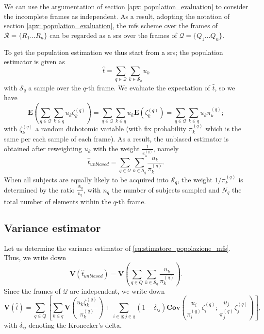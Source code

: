 \begin{appendices}
We can use the argumentation of section \ref{apx: population_evaluation} to consider the incomplete frames as independent.
As a result, adopting the notation of section \ref{apx: population_evaluation}, the \gls{mfs} scheme over the frames of $\mathcal{R} = \{R_{1} \dots R_{n}\}$ can be regarded as a \gls{srs} over the frames of $\mathcal{Q} = \{Q_{1} \dots Q_{n}\}.$

To get the population estimation we thus start from a \gls{srs}; the 
population estimator is given as
$$ \hat{t} = \sum_{q \in \mathcal{Q}}\sum_{k \in \mathcal{S}_q} u_{k}$$
with $\mathcal{S}_q$ a sample over the $q$-th frame.
We evaluate the expectation of $\hat{t}$, so we have
$$ \mathbf{E}\left(\sum_{q \in \mathcal{Q}}\sum_{k \in q} u_{k}\zeta^{(q)}_{k}\right) = \sum_{q \in \mathcal{Q}}\sum_{k \in q} u_{k} \mathbf{E}\left(\zeta^{(q)}_{k}\right) = \sum_{q \in \mathcal{Q}}\sum_{k \in q} u_{k}\pi^{(q)}_{k};$$ with $\zeta^{(q)}_{k}$ a random dichotomic variable (with fix probability $\pi^{(q)}_{k}$ which is the same per each sample of each frame).
As a result, the unbiased estimator is obtained after reweighting 
$u_{k}$ with the weight $\frac{1}{\pi^{(q)}_{k}}$, namely
\begin{equation}\label{eq:stimatore_popolazione_mfs}
    \hat{t}_{unbiased} = \sum_{q \in \mathcal{Q}}\sum_{k \in \mathcal{S}_q} \frac{u_{k}}{\pi^{(q)}_{k}}.
\end{equation} 
When all subjects are equally likely to be acquired into $\mathcal{S}_{q}$, the weight $1/\pi^{(q)}_{k}$ is determined by the ratio $\frac{N_{q}}{n_{q}}$, with $n_{q}$ the number of subjects sampled and $N_{q}$ the total number of elements within the $q$-th frame.

\subsection{Variance estimator}
Let us determine the variance estimator of \eqref{eq:stimatore_popolazione_mfs}.
Thus, we write down
$$\mathbf{V}(\hat{t}_{unbiased}) = \mathbf{V}\left(\sum_{q \in Q}\sum_{k \in \mathcal{S}_q} \frac{u_{k}}{\pi^{(q)}_{k}}\right).$$
Since the frames of $\mathcal{Q}$ are independent, we write down
$$\mathbf{V}(\hat{t}) = \sum_{q \in Q}\left[ \sum_{k \in q}\mathbf{V}\left( \frac{u_{k} \zeta^{(q)}_{k}}{\pi^{(q)}_{k}}\right) + \sum_{i \in q; j \in q} (1-\delta_{ij})\mathbf{Cov}\left(\frac{u_{i}}{\pi^{(q)}_{i}} \zeta^{(q)}_{i}; \frac{u_{j}}{\pi^{(q)}_{j}}\zeta^{(q)}_{j}\right) \right],$$
with $\delta_{ij}$ denoting the Kronecker's delta.


\end{appendices}
